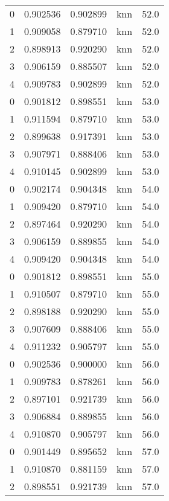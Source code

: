 \begin{tabular}{rrrlr}
     0 & 0.902536 & 0.902899 &      knn &       52.0 \\
     1 & 0.909058 & 0.879710 &      knn &       52.0 \\
     2 & 0.898913 & 0.920290 &      knn &       52.0 \\
     3 & 0.906159 & 0.885507 &      knn &       52.0 \\
     4 & 0.909783 & 0.902899 &      knn &       52.0 \\
     0 & 0.901812 & 0.898551 &      knn &       53.0 \\
     1 & 0.911594 & 0.879710 &      knn &       53.0 \\
     2 & 0.899638 & 0.917391 &      knn &       53.0 \\
     3 & 0.907971 & 0.888406 &      knn &       53.0 \\
     4 & 0.910145 & 0.902899 &      knn &       53.0 \\
     0 & 0.902174 & 0.904348 &      knn &       54.0 \\
     1 & 0.909420 & 0.879710 &      knn &       54.0 \\
     2 & 0.897464 & 0.920290 &      knn &       54.0 \\
     3 & 0.906159 & 0.889855 &      knn &       54.0 \\
     4 & 0.909420 & 0.904348 &      knn &       54.0 \\
     0 & 0.901812 & 0.898551 &      knn &       55.0 \\
     1 & 0.910507 & 0.879710 &      knn &       55.0 \\
     2 & 0.898188 & 0.920290 &      knn &       55.0 \\
     3 & 0.907609 & 0.888406 &      knn &       55.0 \\
     4 & 0.911232 & 0.905797 &      knn &       55.0 \\
     0 & 0.902536 & 0.900000 &      knn &       56.0 \\
     1 & 0.909783 & 0.878261 &      knn &       56.0 \\
     2 & 0.897101 & 0.921739 &      knn &       56.0 \\
     3 & 0.906884 & 0.889855 &      knn &       56.0 \\
     4 & 0.910870 & 0.905797 &      knn &       56.0 \\
     0 & 0.901449 & 0.895652 &      knn &       57.0 \\
     1 & 0.910870 & 0.881159 &      knn &       57.0 \\
     2 & 0.898551 & 0.921739 &      knn &       57.0 \\

\end{tabular}
